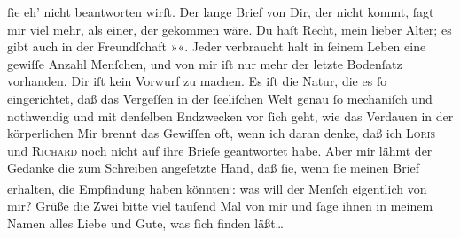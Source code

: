 \begin{ledgroupsized}[t]{13cm}
               ſie eh’ nicht beantworten wirſt. Der lange Brief\strikeout{,} von
               Dir, der nicht kommt, ſagt mir viel mehr, als 
               einer, der gekom{\pb}men wäre. Du haſt Recht, mein
               lieber Alter; es gibt auch in der Freundſchaft »\label{K_L02669-16v}\label{K_L02669-16h}«. Jeder verbraucht halt in ſeinem Leben eine gewiſſe Anzahl Menſchen, und von
               mir iſt nur mehr der letzte Bodenſatz vorhanden. Dir iſt kein Vorwurf zu machen. Es
               iſt die Natur, die es ſo eingerichtet, daß das Vergeſſen in der ſeeliſchen Welt genau
               ſo  mechaniſch und nothwendig und mit denſelben
               Endzwecken vor ſich geht, wie das Verdauen in der körperlichen{\dotsfour}\pend
           \pstart
           Mir brennt das Gewiſſen oft, wenn ich daran denke, daß ich \textsc{Loris} und \textsc{Richard} noch nicht auf ihre Brieſe geantwortet habe. Aber mir lähmt der Gedanke die zum
               Schreiben angeſetzte Hand, daß ſie, wenn ſie meinen Brief erhalten, die Empfindung
               haben könnten\substVorne{}\textsuperscript{\textcolor{gray}{,}}\substDazwischen{}:\substHinten{} was will der Menſch eigentlich von mir? Grüße die Zwei bitte viel {\pb}tauſend Mal von mir und ſage ihnen in meinem Namen
               alles Liebe und Gute, was ſich finden läßt{\dots}\pend

\end{ledgroupsized}
